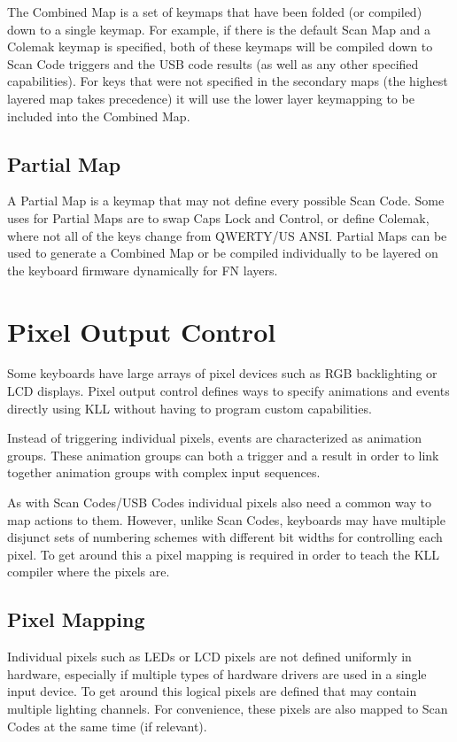 \documentclass{kiibohd-template}
\begin{document}
The Combined Map is a set of keymaps that have been folded (or compiled) down to a single keymap.
For example, if there is the default Scan Map and a Colemak keymap is specified, both of these keymaps will be compiled down to Scan Code triggers and the USB code results (as well as any other specified capabilities).
For keys that were not specified in the secondary maps (the highest layered map takes precedence) it will use the lower layer keymapping to be included into the Combined Map.


\section{Partial Map}

A Partial Map is a keymap that may not define every possible Scan Code.
Some uses for Partial Maps are to swap Caps Lock and Control, or define Colemak, where not all of the keys change from QWERTY/US ANSI.
Partial Maps can be used to generate a Combined Map or be compiled individually to be layered on the keyboard firmware dynamically for FN layers.


\chapter{Pixel Output Control}

Some keyboards have large arrays of pixel devices such as RGB backlighting or LCD displays.
Pixel output control defines ways to specify animations and events directly using KLL without having to program custom capabilities.

Instead of triggering individual pixels, events are characterized as animation groups.
These animation groups can both a trigger and a result in order to link together animation groups with complex input sequences.

As with Scan Codes/USB Codes individual pixels also need a common way to map actions to them.
However, unlike Scan Codes, keyboards may have multiple disjunct sets of numbering schemes with different bit widths for controlling each pixel.
To get around this a pixel mapping is required in order to teach the KLL compiler where the pixels are.


\section{Pixel Mapping}

Individual pixels such as LEDs or LCD pixels are not defined uniformly in hardware, especially if multiple types of hardware drivers are used in a single input device.
To get around this logical pixels are defined that may contain multiple lighting channels.
For convenience, these pixels are also mapped to Scan Codes at the same time (if relevant).
\end{document}
